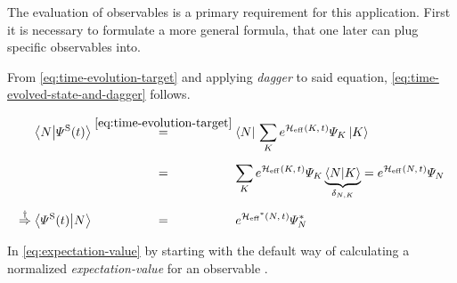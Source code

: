 The evaluation of observables is a primary requirement for this application. 
First it is necessary to formulate a more general formula, that one later can plug specific observables into.

From \autoref{eq:time-evolution-target} and applying \emph{dagger} to said equation, \autoref{eq:time-evolved-state-and-dagger} follows.


\begin{equation}
    \label{eq:time-evolved-state-and-dagger}
    \begin{split}
        \braketHelper{N}{\psiOfT[\schroedingerPicture]} &\stackrel{\ref{eq:time-evolution-target}}{=} \braN{} \lsum[K] e^{\HeffOft[K]} \psiN[K] \ketN[K]{}\\
        & \stackrel{\phantom{\ref{eq:time-evolution-target}}}{=} 
        \lsum[K]   e^{\HeffOft[K]} \psiN[K] \underbrace{\braketHelper{N}{K}}_\text{$\delta_{N,K}$} = e^{\HeffOft} \psiN{} \\
        \stackrel{\dagger}{\Rightarrow} \braketHelper{\psiOfT[\schroedingerPicture]}{N} &\stackrel{\phantom{\ref{eq:time-evolution-target}}}{=} e^{\HeffOftStar} \psiNStar
    \end{split}
\end{equation}

In \autoref{eq:expectation-value} by starting with the default way of calculating a normalized \emph{expectation-value} for an observable \ObservableOp \cite{monteCarloObservableSampling}. 


